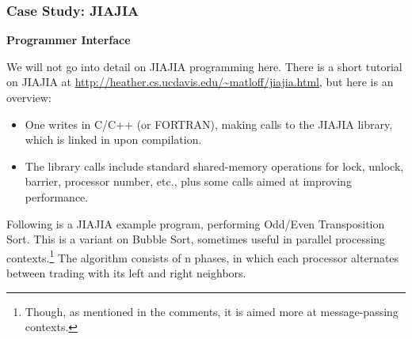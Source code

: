 \subsubsection{Case Study:  JIAJIA}  

\textbf{Programmer Interface} 

We will not go into detail on JIAJIA programming here.  There is 
a short tutorial on JIAJIA at
\url{http://heather.cs.ucdavis.edu/~matloff/jiajia.html}, but
here is an overview:

\begin{itemize}

\item One writes in C/C++ (or FORTRAN), making calls to the
JIAJIA library, which is linked in upon compilation.

\item The library calls include standard shared-memory operations for
lock, unlock, barrier, processor number, etc., plus some calls aimed
at improving performance.

\end{itemize}

Following is a JIAJIA example program, performing Odd/Even Transposition
Sort.  This is a variant on Bubble Sort, sometimes useful in parallel
processing contexts.\footnote{Though, as mentioned in the comments, it
is aimed more at message-passing contexts.}  The algorithm consists of n
phases, in which each processor alternates between trading with its left
and right neighbors.

